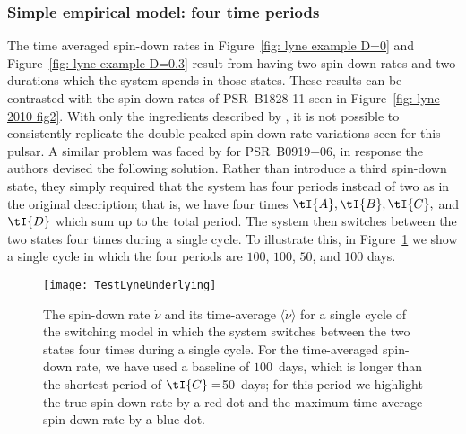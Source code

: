 \subsubsection{Simple empirical model: four time periods}

The time averaged spin-down rates in Figure~\ref{fig: lyne example D=0} and
Figure~\ref{fig: lyne example D=0.3} result from having two spin-down rates and
two durations which the system spends in those states. These results can be
contrasted with the spin-down rates of PSR~B1828-11 seen in Figure~\ref{fig: lyne
2010 fig2}.  With only the ingredients described by \citet{Lyne2010}, it is not
possible to consistently replicate the double peaked spin-down rate variations
seen for this pulsar. A similar problem was faced by \citet{Perera2015} for
PSR~B0919+06, in response the authors devised the following solution. Rather
than introduce a third spin-down state, they simply required that the system
has four periods instead of two as in the original \citet{Lyne2010}
description; that is, we have four times $\tI{A}, \tI{B}, \tI{C},$ and $\tI{D}$
which sum up to the total period.
The system then switches between the two states four times during
a single cycle.  To illustrate this, in Figure~\ref{fig: test lyne underlying} we
show a single cycle in which the four periods are $100$, $100$, $50$, and $100$
days.
\begin{figure}[htb]
    \centering
    \texttt{[image: TestLyneUnderlying]}
    \caption{The spin-down rate $\dot{\nu}$ and its time-average $\langle\dot{\nu}\rangle$
    for a single cycle of the \citet{Perera2015} switching model in which the
    system switches between the two states four times during a single cycle.
    For the time-averaged spin-down rate, we have used a baseline of $100$~days,
    which is longer than the shortest period of $\tI{C}=$50~days; for this period we
    highlight the true spin-down rate by a red dot and the maximum time-average
    spin-down rate by a blue dot.}
    \label{fig: test lyne underlying}
\end{figure}

